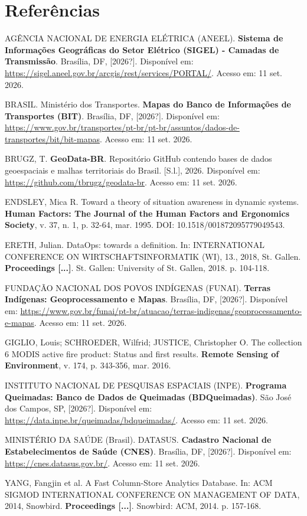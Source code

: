 \section*{Referências}

AGÊNCIA NACIONAL DE ENERGIA ELÉTRICA (ANEEL). \textbf{Sistema de Informações Geográficas do Setor Elétrico (SIGEL) - Camadas de Transmissão}. Brasília, DF, [2026?]. Disponível em: \url{https://sigel.aneel.gov.br/arcgis/rest/services/PORTAL/}. Acesso em: 11 set. 2026.

BRASIL. Ministério dos Transportes. \textbf{Mapas do Banco de Informações de Transportes (BIT)}. Brasília, DF, [2026?]. Disponível em: \url{https://www.gov.br/transportes/pt-br/pt-br/assuntos/dados-de-transportes/bit/bit-mapas}. Acesso em: 11 set. 2026.

BRUGZ, T. \textbf{GeoData-BR}. Repositório GitHub contendo bases de dados geoespaciais e malhas territoriais do Brasil. [S.l.], 2026. Disponível em: \url{https://github.com/tbrugz/geodata-br}. Acesso em: 11 set. 2026.

ENDSLEY, Mica R. Toward a theory of situation awareness in dynamic systems. \textbf{Human Factors: The Journal of the Human Factors and Ergonomics Society}, v. 37, n. 1, p. 32-64, mar. 1995. DOI: 10.1518/001872095779049543.

ERETH, Julian. DataOps: towards a definition. In: INTERNATIONAL CONFERENCE ON WIRTSCHAFTSINFORMATIK (WI), 13., 2018, St. Gallen. \textbf{Proceedings [...]}. St. Gallen: University of St. Gallen, 2018. p. 104-118.

FUNDAÇÃO NACIONAL DOS POVOS INDÍGENAS (FUNAI). \textbf{Terras Indígenas: Geoprocessamento e Mapas}. Brasília, DF, [2026?]. Disponível em: \url{https://www.gov.br/funai/pt-br/atuacao/terras-indigenas/geoprocessamento-e-mapas}. Acesso em: 11 set. 2026.

GIGLIO, Louis; SCHROEDER, Wilfrid; JUSTICE, Christopher O. The collection 6 MODIS active fire product: Status and first results. \textbf{Remote Sensing of Environment}, v. 174, p. 343-356, mar. 2016.

INSTITUTO NACIONAL DE PESQUISAS ESPACIAIS (INPE). \textbf{Programa Queimadas: Banco de Dados de Queimadas (BDQueimadas)}. São José dos Campos, SP, [2026?]. Disponível em: \url{https://data.inpe.br/queimadas/bdqueimadas/}. Acesso em: 11 set. 2026.

MINISTÉRIO DA SAÚDE (Brasil). DATASUS. \textbf{Cadastro Nacional de Estabelecimentos de Saúde (CNES)}. Brasília, DF, [2026?]. Disponível em: \url{https://cnes.datasus.gov.br/}. Acesso em: 11 set. 2026.

YANG, Fangjin et al. A Fast Column-Store Analytics Database. In: ACM SIGMOD INTERNATIONAL CONFERENCE ON MANAGEMENT OF DATA, 2014, Snowbird. \textbf{Proceedings [...]}. Snowbird: ACM, 2014. p. 157-168.
